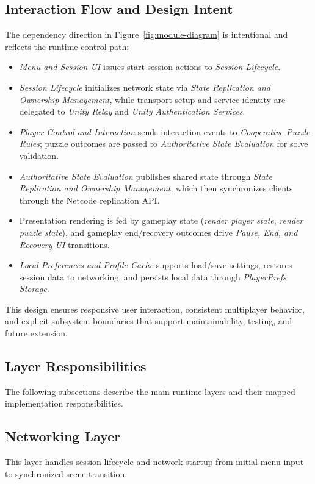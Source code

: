 \subsection*{Interaction Flow and Design Intent}
The dependency direction in Figure~\ref{fig:module-diagram} is intentional and reflects the runtime control path:
\begin{itemize}
\item \textit{Menu and Session UI} issues start-session actions to \textit{Session Lifecycle}.
\item \textit{Session Lifecycle} initializes network state via \textit{State Replication and Ownership Management}, while transport setup and service identity are delegated to \textit{Unity Relay} and \textit{Unity Authentication Services}.
\item \textit{Player Control and Interaction} sends interaction events to \textit{Cooperative Puzzle Rules}; puzzle outcomes are passed to \textit{Authoritative State Evaluation} for solve validation.
\item \textit{Authoritative State Evaluation} publishes shared state through \textit{State Replication and Ownership Management}, which then synchronizes clients through the Netcode replication API.
\item Presentation rendering is fed by gameplay state (\textit{render player state}, \textit{render puzzle state}), and gameplay end/recovery outcomes drive \textit{Pause, End, and Recovery UI} transitions.
\item \textit{Local Preferences and Profile Cache} supports load/save settings, restores session data to networking, and persists local data through \textit{PlayerPrefs Storage}.
\end{itemize}

This design ensures responsive user interaction, consistent multiplayer behavior, and explicit subsystem boundaries that support maintainability, testing, and future extension.

\subsection*{Layer Responsibilities}
The following subsections describe the main runtime layers and their mapped implementation responsibilities.

\subsection*{Networking Layer}
This layer handles session lifecycle and network startup from initial menu input to synchronized scene transition.

